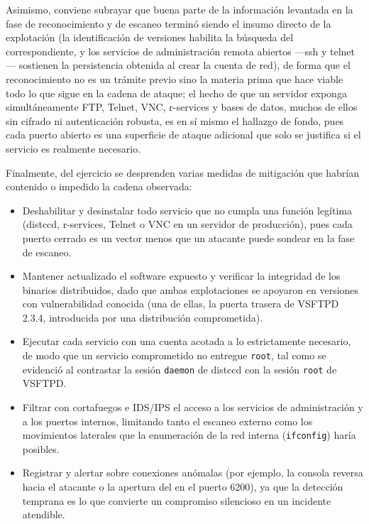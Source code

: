 Asimismo, conviene subrayar que buena parte de la información levantada en la fase de reconocimiento y de escaneo terminó siendo el insumo directo de la explotación (la identificación de versiones habilita la búsqueda del  correspondiente, y los servicios de administración remota abiertos —ssh y telnet— sostienen la persistencia obtenida al crear la cuenta de red), de forma que el reconocimiento no es un trámite previo sino la materia prima que hace viable todo lo que sigue en la cadena de ataque; el hecho de que un servidor exponga simultáneamente FTP, Telnet, VNC, r-services y bases de datos, muchos de ellos sin cifrado ni autenticación robusta, es en sí mismo el hallazgo de fondo, pues cada puerto abierto es una superficie de ataque adicional que solo se justifica si el servicio es realmente necesario.

Finalmente, del ejercicio se desprenden varias medidas de mitigación que habrían contenido o impedido la cadena observada:

\begin{itemize}
  \item {} Deshabilitar y desinstalar todo servicio que no cumpla una función legítima (distccd, r-services, Telnet o VNC en un servidor de producción), pues cada puerto cerrado es un vector menos que un atacante puede sondear en la fase de escaneo.
  \item {} Mantener actualizado el software expuesto y verificar la integridad de los binarios distribuidos, dado que ambas explotaciones se apoyaron en versiones con vulnerabilidad conocida (una de ellas, la puerta trasera de VSFTPD 2.3.4, introducida por una distribución comprometida).
  \item {} Ejecutar cada servicio con una cuenta acotada a lo estrictamente necesario, de modo que un servicio comprometido no entregue \texttt{root}, tal como se evidenció al contrastar la sesión \texttt{daemon} de distccd con la sesión \texttt{root} de VSFTPD.
  \item {} Filtrar con cortafuegos e IDS/IPS el acceso a los servicios de administración y a los puertos internos, limitando tanto el escaneo externo como los movimientos laterales que la enumeración de la red interna (\texttt{ifconfig}) haría posibles.
  \item {} Registrar y alertar sobre conexiones anómalas (por ejemplo, la consola reversa hacia el atacante o la apertura del  en el puerto 6200), ya que la detección temprana es lo que convierte un compromiso silencioso en un incidente atendible.
\end{itemize}
